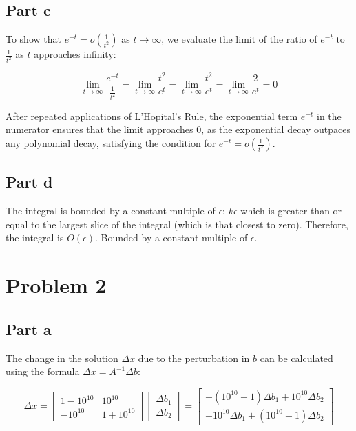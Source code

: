 \documentclass[12pt]{article}
\begin{document}
\subsection*{Part c}

To show that \(e^{-t} = o\left(\frac{1}{t^2}\right)\) as \(t \rightarrow \infty\), we evaluate the limit of the ratio of \(e^{-t}\) to \(\frac{1}{t^2}\) as \(t\) approaches infinity:

\[
\lim_{t \to \infty} \frac{e^{-t}}{\frac{1}{t^2}} =  \lim_{t \to \infty} \frac{t^2}{e^t} = \lim_{t \to \infty} \frac{t^2}{e^t} = \lim_{t \to \infty} \frac{2}{e^t} = 0
\]

After repeated applications of L'Hopital's Rule, the exponential term \(e^{-t}\) in the numerator ensures that the limit approaches 0, as the exponential decay outpaces any polynomial decay, satisfying the condition for \(e^{-t} = o\left(\frac{1}{t^2}\right)\).


\subsection*{Part d}

The integral is bounded by a constant multiple of $\epsilon$: $k \epsilon$ which is greater than or equal to the largest slice of the integral (which is that closest to zero). Therefore, the integral is $O(\epsilon)$.
Bounded by a constant multiple of $\epsilon$.

\newpage

\section*{Problem 2}

\subsection*{Part a}

The change in the solution $\Delta x$ due to the perturbation in $b$ can be calculated using the formula $\Delta x = A^{-1} \Delta b$:

\[
\Delta x = 
\begin{bmatrix}
1 - 10^{10} & 10^{10} \\
-10^{10} & 1 + 10^{10}
\end{bmatrix}
\begin{bmatrix}
\Delta b_1 \\
\Delta b_2
\end{bmatrix}
=
\begin{bmatrix}
-(10^{10} - 1)\Delta b_1 + 10^{10}\Delta b_2 \\
-10^{10}\Delta b_1 + (10^{10} + 1)\Delta b_2
\end{bmatrix}
\]
\end{document}
